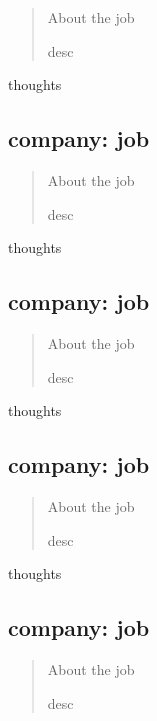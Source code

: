 \documentclass[
	letterpaper, %
	12pt, %
]{CSSullivanBusinessReport}
\begin{document}
\begin{quote}
	About the job
	
	desc

\end{quote}

thoughts


\subsection[company]{company: job}

\begin{quote}
	About the job
	
	desc

\end{quote}

thoughts


\subsection[company]{company: job}

\begin{quote}
	About the job
	
	desc

\end{quote}

thoughts



\subsection[company]{company: job}

\begin{quote}
	About the job
	
	desc

\end{quote}

thoughts


\subsection[company]{company: job}

\begin{quote}
	About the job
	
	desc

\end{quote}
\end{document}
